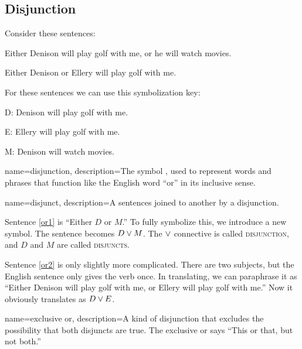 
\subsection{Disjunction}
Consider these sentences:
\begin{earg}
\item[\ex{or1}]Either Denison will play golf with me, or he will watch movies.
\item[\ex{or2}]Either Denison or Ellery will play golf with me. 
\end{earg}

For these sentences we can use this symbolization key:

\begin{ekey}
\item[D:] Denison will play golf with me.
\item[E:] Ellery will play golf with me.
\item[M:] Denison will watch movies.
\end{ekey}

{
name=disjunction,
description={The symbol \eor, used to represent words and phrases that function like the English word ``or'' in its inclusive sense.}
}

{
name=disjunct,
description={A sentences joined to another by a disjunction.}
}



Sentence \ref{or1} is ``Either $D$ or $M$.'' To fully symbolize this, we introduce a new symbol. The sentence becomes $D \vee M$. The $\vee$ connective is called \textsc{\gls{disjunction}}, \label{def:disjunction} and $D$ and $M$ are called \textsc{\glspl{disjunct}}. \label{def:disjunct}

Sentence \ref{or2} is only slightly more complicated. There are two subjects, but the English sentence only gives the verb once. In translating, we can paraphrase it as ``Either Denison will play golf with me, or Ellery will play golf with me.'' Now it obviously translates as $D \vee E$.




{
name=exclusive or,
description={A kind of disjunction that excludes the possibility that both disjuncts are true. The exclusive or says ``This or that, but not both.''}
}


